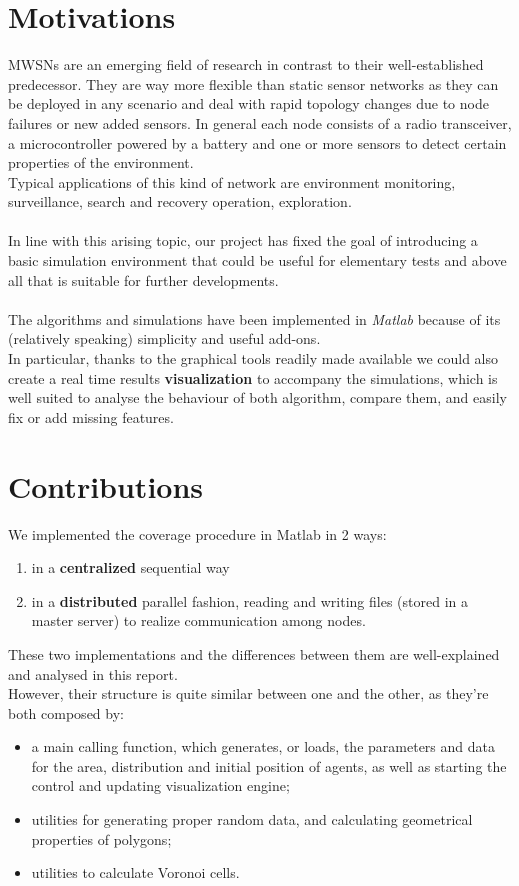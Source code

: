 \documentclass[a4paper,11pt,oneside]{book}
\begin{document}
	\section*{Motivations}
	MWSNs are an emerging field of research in contrast to their well-established predecessor. They are way more flexible than static sensor networks as they can be deployed in any scenario and deal with rapid topology changes due to node failures or new added sensors. In general each node consists of a radio transceiver, a microcontroller powered by a battery and one or more sensors to detect certain properties of the environment.~\cite{K2}\\ 
	Typical applications of this kind of network are environment monitoring, surveillance, search and recovery operation, exploration.\\\\
	In line with this arising topic, our project has fixed the goal of introducing a basic simulation environment that could be useful for elementary tests and above all that is suitable for further developments.\\\\
	The algorithms and simulations have been implemented in \emph{Matlab} because of its (relatively speaking) simplicity and useful add-ons.\\
	In particular, thanks to the graphical tools readily made available we could also create a real time results \textbf{visualization} to accompany the simulations, which is well suited to analyse the behaviour of both algorithm, compare them, and easily fix or add missing features.
	
	
	\section*{Contributions}
		We implemented the coverage procedure in Matlab in 2 ways:
	\begin{enumerate}
		\item in a \textbf{centralized }sequential way
		\item in a \textbf{distributed} parallel fashion, reading and writing files (stored in a master server) to realize communication among nodes.
	\end{enumerate}
	These two implementations and the differences between them are well-explained and analysed in this report.\\	
	However, their structure is quite similar between one and the other, as they're both composed by:
	\begin{itemize}
		\item a main calling function, which generates, or loads, the parameters and data for the area, distribution and initial position of agents, as well as starting the control and updating visualization engine;
		\item utilities for generating proper random data, and calculating geometrical properties of polygons;
		\item utilities to calculate Voronoi cells.
	\end{itemize}
\end{document}
